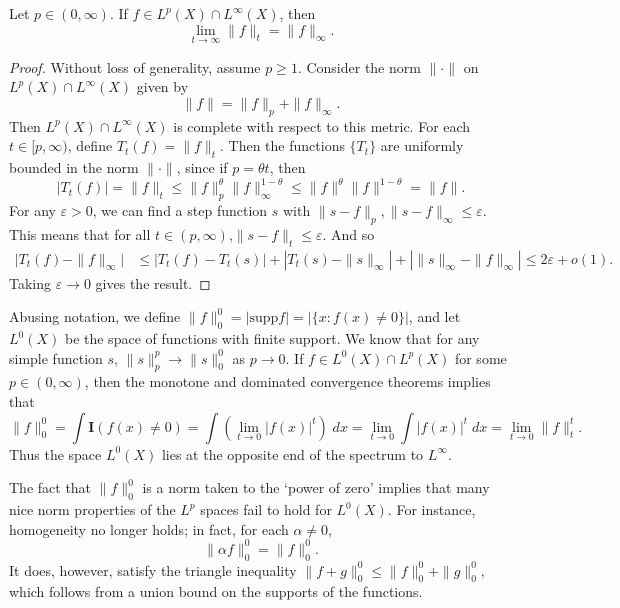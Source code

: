 \begin{theorem}
    Let $p \in (0,\infty)$. If $f \in L^p(X) \cap L^\infty(X)$, then
    \[ \lim_{t \to \infty} \| f \|_t = \| f \|_\infty. \]
\end{theorem}
\begin{proof}
    Without loss of generality, assume $p \geq 1$. Consider the norm $\| \cdot \|$ on $L^p(X) \cap L^\infty(X)$ given by
    \[ \| f \| = \| f \|_p + \| f \|_\infty. \]
    Then $L^p(X) \cap L^\infty(X)$ is complete with respect to this metric. For each $t \in [p,\infty)$, define $T_t(f) = \| f \|_t$. Then the functions $\{ T_t \}$ are uniformly bounded in the norm $\| \cdot \|$, since if $p = \theta t$, then
    \[ |T_t(f)| = \| f \|_t \leq \| f \|_p^\theta \| f \|_\infty^{1-\theta} \leq \| f \|^\theta \| f \|^{1-\theta} = \| f \|. \]
    For any $\varepsilon > 0$, we can find a step function $s$ with $\| s - f \|_p, \| s - f \|_\infty \leq \varepsilon$. This means that for all $t \in (p,\infty)$,$\| s - f \|_t \leq \varepsilon$. And so
    \begin{align*}
        \Big| T_t(f) - \| f \|_\infty \Big| &\leq |T_t(f) - T_t(s)| + |T_t(s) - \| s \|_\infty| + |\| s \|_\infty - \| f \|_\infty| \leq 2\varepsilon + o(1).
    \end{align*}
    Taking $\varepsilon \to 0$ gives the result.
\end{proof}

Abusing notation, we define $\| f \|_0^0 = | \text{supp} f | = | \{ x: f(x) \neq 0 \} |$, and let $L^0(X)$ be the space of functions with finite support. We know that for any simple function $s$, $\| s \|_p^p \to \| s \|_0^0$ as $p \to 0$. If $f \in L^0(X) \cap L^p(X)$ for some $p \in (0,\infty)$, then the monotone and dominated convergence theorems implies that
%
\[ \| f \|_0^0 = \int \mathbf{I}(f(x) \neq 0) = \int \left( \lim_{t \to 0} |f(x)|^t \right)\; dx = \lim_{t \to 0} \int |f(x)|^t\; dx = \lim_{t \to 0} \| f \|_t^t. \]
%
Thus the space $L^0(X)$ lies at the opposite end of the spectrum to $L^\infty$.

The fact that $\| f \|_0^0$ is a norm taken to the `power of zero' implies that many nice norm properties of the $L^p$ spaces fail to hold for $L^0(X)$. For instance, homogeneity no longer holds; in fact, for each $\alpha \neq 0$,
%
\[ \| \alpha f \|_0^0 = \| f \|_0^0. \]
%
It does, however, satisfy the triangle inequality $\| f + g \|_0^0 \leq \| f \|_0^0 + \| g \|_0^0$, which follows from a union bound on the supports of the functions.

